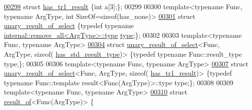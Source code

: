 \begin{DoxyCode}
\hyperlink{struct_eigen_1_1internal_1_1has__tr1__result}{00298} \textcolor{keyword}{struct }\hyperlink{struct_eigen_1_1internal_1_1has__tr1__result}{has\_tr1\_result} \{\textcolor{keywordtype}{int} a[3];\};
00299 
00300 \textcolor{keyword}{template}<\textcolor{keyword}{typename} Func, \textcolor{keyword}{typename} ArgType, \textcolor{keywordtype}{int} SizeOf=sizeof(has\_none)>
\hyperlink{struct_eigen_1_1internal_1_1unary__result__of__select}{00301} \textcolor{keyword}{struct }\hyperlink{struct_eigen_1_1internal_1_1unary__result__of__select}{unary\_result\_of\_select} \{\textcolor{keyword}{typedef} \textcolor{keyword}{typename} 
      \hyperlink{group___sparse_core___module}{internal::remove\_all<ArgType>::type} \hyperlink{group___sparse_core___module}{type};\};
00302 
00303 \textcolor{keyword}{template}<\textcolor{keyword}{typename} Func, \textcolor{keyword}{typename} ArgType>
\hyperlink{struct_eigen_1_1internal_1_1unary__result__of__select_3_01_func_00_01_arg_type_00_01sizeof_07has__std__result__type_08_4}{00304} \textcolor{keyword}{struct }\hyperlink{struct_eigen_1_1internal_1_1unary__result__of__select}{unary\_result\_of\_select}<Func, ArgType, sizeof(
      \hyperlink{struct_eigen_1_1internal_1_1has__std__result__type}{has\_std\_result\_type})> \{\textcolor{keyword}{typedef} \textcolor{keyword}{typename} Func::result\_type type;\};
00305 
00306 \textcolor{keyword}{template}<\textcolor{keyword}{typename} Func, \textcolor{keyword}{typename} ArgType>
\hyperlink{struct_eigen_1_1internal_1_1unary__result__of__select_3_01_func_00_01_arg_type_00_01sizeof_07has__tr1__result_08_4}{00307} \textcolor{keyword}{struct }\hyperlink{struct_eigen_1_1internal_1_1unary__result__of__select}{unary\_result\_of\_select}<Func, ArgType, sizeof(
      \hyperlink{struct_eigen_1_1internal_1_1has__tr1__result}{has\_tr1\_result})> \{\textcolor{keyword}{typedef} \textcolor{keyword}{typename} Func::template result<Func(ArgType)>::type type;\};
00308 
00309 \textcolor{keyword}{template}<\textcolor{keyword}{typename} Func, \textcolor{keyword}{typename} ArgType>
\hyperlink{struct_eigen_1_1internal_1_1result__of_3_01_func_07_arg_type_08_4}{00310} \textcolor{keyword}{struct }\hyperlink{struct_eigen_1_1internal_1_1result__of}{result\_of}<Func(ArgType)> \{

\end{DoxyCode}
